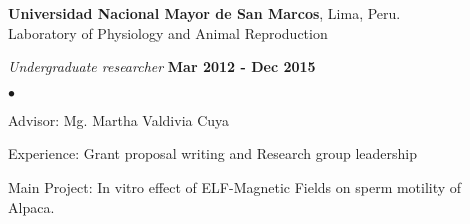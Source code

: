 \documentclass[margin,line]{res}
\newenvironment{list1}{
  \begin{list}{\ding{113}}{%
      \setlength{\itemsep}{0in}
      \setlength{\parsep}{0in} \setlength{\parskip}{0in}
      \setlength{\topsep}{0in} \setlength{\partopsep}{0in}
      \setlength{\leftmargin}{0.17in}}}{\end{list}}
\newenvironment{list2}{
  \begin{list}{$\bullet$}{%
      \setlength{\itemsep}{0in}
      \setlength{\parsep}{0in} \setlength{\parskip}{0in}
      \setlength{\topsep}{0in} \setlength{\partopsep}{0in}
      \setlength{\leftmargin}{0.2in}}}{\end{list}}
\begin{document}
\begin{resume}
{\bf Universidad Nacional Mayor de San Marcos}, Lima, Peru.\\
Laboratory of Physiology and Animal Reproduction\\
\vspace*{-.1in}
\begin{list1}
	\item[] {\em Undergraduate researcher} \hfill {\bf Mar 2012 - Dec 2015}\\
	\vspace*{-.1in}
	\begin{list2} %
		\item Advisor: Mg. Martha Valdivia Cuya
		\item Experience: Grant proposal writing and Research group leadership %
		\item Main Project: In vitro effect of ELF-Magnetic Fields on sperm motility of Alpaca.\\ %
	\end{list2}
\end{list1}


\end{resume}
\end{document}
